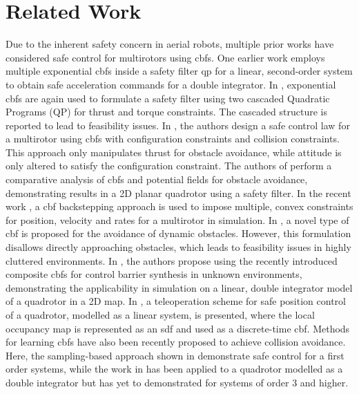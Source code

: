\section{Related Work}
\label{sec:relatedwork}

Due to the inherent safety concern in aerial robots, multiple prior works have considered safe control for multirotors using \acp{cbf}. One earlier work employs multiple exponential \acp{cbf} inside a safety filter \ac{qp} for a linear, second-order system to obtain safe acceleration commands for a double integrator. In \cite{cascaded_CBF}, exponential \acp{cbf} are again used to formulate a safety filter using two cascaded Quadratic Programs (QP) for thrust and torque constraints. The cascaded structure is reported to lead to feasibility issues. In \cite{range_sensing_CBF}, the authors design a safe control law for a multirotor using \acp{cbf} with configuration constraints and collision constraints. This approach only manipulates thrust for obstacle avoidance, while attitude is only altered to satisfy the configuration constraint.
The authors of \cite{cbf_potential_field_analysis} perform a comparative analysis of \acp{cbf} and potential fields for obstacle avoidance, demonstrating results in a 2D planar quadrotor using a safety filter.
In the recent work \cite{backstepping_CBF}, a \ac{cbf} backstepping approach is used to impose multiple, convex constraints for position, velocity and rates for a multirotor in simulation. In \cite{collisionConeCBF}, a novel type of \ac{cbf} is proposed for the avoidance of dynamic obstacles. However, this formulation disallows directly approaching obstacles, which leads to feasibility issues in highly cluttered environments.
In \cite{compositeCBFtemporal}, the authors propose using the recently introduced composite \acp{cbf} for control barrier synthesis in unknown environments, demonstrating the applicability in simulation on a linear, double integrator model of a quadrotor in a 2D map.
In \cite{CBF_aided_teleop}, a teleoperation scheme for safe position control of a quadrotor, modelled as a linear system, is presented, where the local occupancy map is represented as an \ac{sdf} and used as a discrete-time \ac{cbf}.
Methods for learning \acp{cbf} have also been recently proposed to achieve collision avoidance. Here, the sampling-based approach shown in \cite{dawson2022learning} demonstrate safe control for a first order systems, while the work in \cite{harms2024neural} has been applied to a quadrotor modelled as a double integrator but has yet to demonstrated for systems of order 3 and higher.